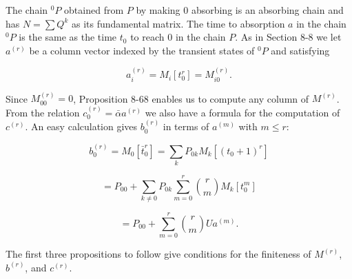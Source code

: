 The chain $^0P$ obtained from $P$ by making 0 absorbing is an absorbing chain and has $N = \sum Q^k$ as its fundamental matrix. The time to absorption $a$ in the chain $^0P$ is the same as the time $t_0$ to reach 0 in the chain $P$. As in Section 8-8 we let $a^{(r)}$ be a column vector indexed by the transient states of $^0P$ and satisfying

$$a_i^{(r)} = M_i[t_0^r] = M_{i0}^{(r)}.$$

Since $M_{00}^{(r)} = 0$, Proposition 8-68 enables us to compute any column of $M^{(r)}$. From the relation $c_0^{(r)} = \bar{\alpha} a^{(r)}$ we also have a formula for the computation of $c^{(r)}$. An easy calculation gives $b_0^{(r)}$ in terms of $a^{(m)}$ with $m \leq r$:

$$b_0^{(r)} = M_0[\bar{t}_0^r] = \sum_k P_{0k} M_k[(t_0 + 1)^r]$$

$$= P_{00} + \sum_{k \neq 0} P_{0k} \sum_{m=0}^{r} \binom{r}{m} M_k[t_0^m]$$

$$= P_{00} + \sum_{m=0}^{r} \binom{r}{m} Ua^{(m)}.$$

The first three propositions to follow give conditions for the finiteness of $M^{(r)}$, $b^{(r)}$, and $c^{(r)}$.
